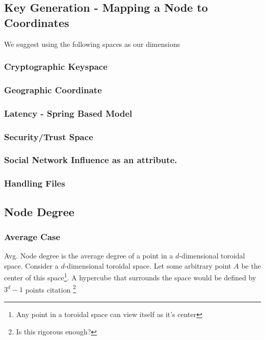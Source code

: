 \documentclass{IEEEtran}
\begin{document}
\subsection{Key Generation - Mapping a Node to Coordinates}

We suggest using the following spaces as our dimensions

\subsubsection{Cryptographic Keyspace}


\subsubsection{Geographic Coordinate}

\subsubsection{Latency - Spring Based Model}

\subsubsection{Security/Trust Space}

\subsubsection{Social Network Influence as an attribute.}

\subsubsection{Handling Files}



\subsection{Node Degree}

\subsubsection{Average Case}
Avg. Node degree is the average degree of a point in a $d$-dimensional toroidal space.  
Consider a $d$-dimensional toroidal space.  Let some arbitrary point $A$ be the center of this space\footnote{Any point in a toroidal space can view itself as it's center}.  A hypercube that surrounds the space would be defined by $3^d -1$ points citation \footnote{Is this rigorous enough?}
\end{document}
